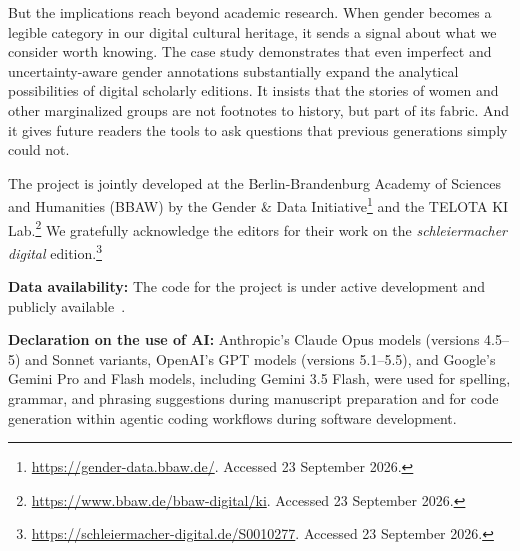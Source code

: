 \documentclass{eceasst}
\newenvironment{aiuse}{%
  \par\vspace{11pt}%
  \noindent\textbf{Declaration on the use of AI:}\enspace}{%
  \par\vspace{11pt}}
\newenvironment{data}{%
  \par\vspace{11pt}%
  \noindent\textbf{Data availability:}\enspace}{%
  \par\vspace{11pt}}
\begin{document}
But the implications reach beyond academic research. When gender becomes a legible category in our digital cultural heritage, it sends a signal about what we consider worth knowing. The case study demonstrates that even imperfect and uncertainty-aware gender annotations substantially expand the analytical possibilities of digital scholarly editions. It insists that the stories of women and other marginalized groups are not footnotes to history, but part of its fabric. And it gives future readers the tools to ask questions that previous generations simply could not.

\begin{acknowledge}
The project is jointly developed at the Berlin-Brandenburg Academy of Sciences and Humanities (BBAW) by the Gender \& Data Initiative\footnote{\url{https://gender-data.bbaw.de/}. Accessed 23 September 2026.} and the TELOTA KI Lab.\footnote{\url{https://www.bbaw.de/bbaw-digital/ki}. Accessed 23 September 2026.} We gratefully acknowledge the editors for their work on the \textit{schleiermacher digital} edition.\footnote{\url{https://schleiermacher-digital.de/S0010277}. Accessed 23 September 2026.}
\end{acknowledge}

\begin{data}
The code for the project is under active development and publicly available~\cite{gendertagger_software_2026}.
\end{data}

\begin{aiuse}
Anthropic's Claude Opus models (versions 4.5--5) and Sonnet variants, OpenAI's GPT models (versions 5.1--5.5), and Google's Gemini Pro and Flash models, including Gemini 3.5 Flash, were used for spelling, grammar, and phrasing suggestions during manuscript preparation and for code generation within agentic coding workflows during software development.
\end{aiuse}



\end{document}
